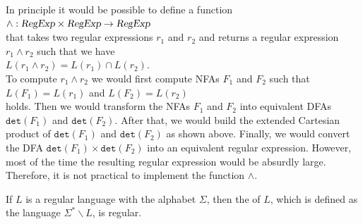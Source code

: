 \remarkEng
In principle it would be possible to define a function
\\[0.2cm]
\hspace*{1.3cm}
$\wedge: \textsl{RegExp} \times \textsl{RegExp} \rightarrow \textsl{RegExp}$
\\[0.2cm]
that takes two regular expressions $r_1$ and $r_2$ and returns a regular expression  $r_1 \wedge r_2$ such that
we have
\\[0.2cm]
\hspace*{1.3cm}
$L(r_1 \wedge r_2) = L(r_1) \cap L(r_2)$.
\\[0.2cm]
To compute $r_1 \wedge r_2$ we would first compute  \textsc{NFA}s  $F_1$ and $F_2$ such that
\\[0.2cm]
\hspace*{1.3cm}
$L(F_1) = L(r_1)$ \quad and \quad $L(F_2) = L(r_2)$
\\[0.2cm] 
holds.  Then we would transform the \textsc{NFA}s $F_1$ and $F_2$ into equivalent 
\textsc{DFA}s $\mathtt{det}(F_1)$ and $\mathtt{det}(F_2)$.  After that, we would build
the extended Cartesian product of $\mathtt{det}(F_1)$ and $\mathtt{det}(F_2)$ as shown above. 
Finally, we would convert the \textsc{DFA} $\mathtt{det}(F_1) \times\mathtt{det}(F_2)$ into an equivalent
regular expression.  However, most of the time the resulting regular expression would be absurdly large. 
Therefore, it is not practical to implement the function $\wedge$.
\eox

\begin{Proposition}
  If $L$ is a regular language with the alphabet $\Sigma$, then the  
  of $L$, which is defined as the language $\Sigma^* \backslash L$, is regular.
\end{Proposition}

